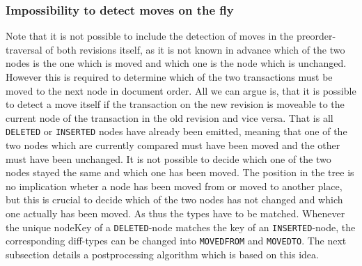 \subsubsection{Impossibility to detect moves on the fly} Note that it is not possible to include the detection of moves in the preorder-traversal of both revisions itself, as it is not known in advance which of the two nodes is the one which is moved and which one is the node which is unchanged. However this is required to determine which of the two transactions must be moved to the next node in document order. All we can argue is, that it is possible to detect a move itself if the transaction on the new revision is moveable to the current node of the transaction in the old revision and vice versa. That is all \texttt{DELETED} or \texttt{INSERTED} nodes have already been emitted, meaning that one of the two nodes which are currently compared must have been moved and the other must have been unchanged. It is not possible to decide which one of the two nodes stayed the same and which one has been moved. The position in the tree is no implication wheter a node has been moved from or moved to another place, but this is crucial to decide which of the two nodes has not changed and which one actually has been moved. As thus the types have to be matched. Whenever the unique nodeKey of a \texttt{DELETED}-node matches the key of an \texttt{INSERTED}-node, the corresponding diff-types can be changed into \texttt{MOVEDFROM} and \texttt{MOVEDTO}. The next subsection details a postprocessing algorithm which is based on this idea.

